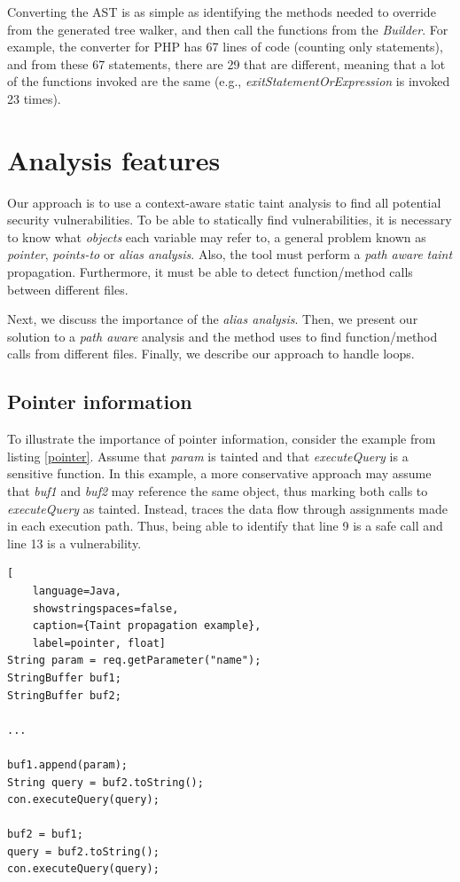 

Converting the AST is as simple as identifying the methods needed to override from the generated tree walker, and then call the functions from the \textit{\astname{} Builder}.
For example, the converter for PHP has 67 lines of code (counting only statements), and from these 67 statements, there are 29 that are different, meaning that a lot of the functions invoked are the same (e.g., \textit{exitStatementOrExpression} is invoked 23 times). 


\section{Analysis features}
\label{analysisfeatures}
Our approach is to use a context-aware static taint analysis to find all potential security vulnerabilities. To be able to statically find vulnerabilities, it is necessary to know what \textit{objects} each variable may refer to, a general problem known as \textit{pointer}, \textit{points-to} or \textit{alias analysis}\cite{sridharan2013alias}. Also, the tool must perform a \textit{path aware} \textit{taint} propagation. Furthermore, it must be able to detect function/method calls between different files.

Next, we discuss the importance of the \textit{alias analysis}. Then, we present our solution to a \textit{path aware} analysis and the method \toolname{} uses to find function/method calls from different files. Finally, we describe our approach to handle loops.

\subsection{Pointer information} 
To illustrate the importance of pointer information, consider the example from listing \ref{pointer}. Assume that \textit{param} is tainted and that \textit{executeQuery} is a sensitive function. In this example, a more conservative approach may assume that \textit{buf1} and \textit{buf2} may reference the same object, thus marking both calls to \textit{executeQuery} as tainted. Instead, \toolname{} traces the data flow through assignments made in each execution path. Thus, being able to identify that line 9 is a safe call and line 13 is a vulnerability.


\begin{lstlisting}[
    language=Java,
    showstringspaces=false,
    caption={Taint propagation example},
    label=pointer, float] 
String param = req.getParameter("name");
StringBuffer buf1;
StringBuffer buf2;

...

buf1.append(param);
String query = buf2.toString();
con.executeQuery(query);

buf2 = buf1;
query = buf2.toString();
con.executeQuery(query);
\end{lstlisting}

